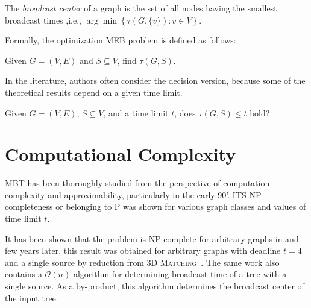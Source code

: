 The \emph{broadcast center} of a graph is the set of all nodes having the smallest broadcast times ,i.e., $\arg\min\left\{\tau(G,\{v\}):v\in V\right\}$.

Formally, the optimization MEB problem is defined as follows:
\begin{problem}\label{mbt:opt}
Given $G=(V,E)$ and $S\subseteq V$, find $\tau(G,S)$. 
\end{problem}

In the literature, authors often consider the decision version, because some of the theoretical results depend on a given time limit.
\begin{problem}\label{mbt:dec}
Given $G=(V,E)$, $S\subseteq V$,  and a time limit $t$, does $\tau(G,S)\leq t$ hold? 
\end{problem}


\section{Computational Complexity}

MBT has been thoroughly studied from the perspective of computation complexity and approximability, particularly in the early 90'.
ITS NP-completeness or belonging to P was shown for various graph classes and values of time limit $t$.

It has been shown that the problem is NP-complete for arbitrary graphs in \cite{garey79} and few years later, 
this result was obtained for arbitrary graphs with deadline $t=4$ and a single source by reduction from \textsc{3D Matching}~\cite{slater81}. 
The same work also contains a $\mathcal{O}(n)$ algorithm for determining broadcast time of a tree with a single source. 
As a by-product, this algorithm determines the broadcast center of the input tree.

